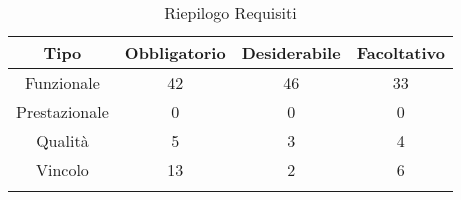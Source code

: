 \normalsize
\begin{longtable}{|c|c|c|c|}
\hline
\textbf{Tipo} & \textbf{Obbligatorio} & \textbf{Desiderabile} & \textbf{Facoltativo}\\
\hline
Funzionale & 42 & 46 & 33\\ \hline
Prestazionale & 0 & 0 & 0\\ \hline
Qualità & 5 & 3 & 4\\ \hline
Vincolo & 13 & 2 & 6\\ \hline
\caption[Riepilogo Requisiti]{Riepilogo Requisiti}
\label{tabella:riepilogorequi}
\end{longtable}
\clearpage
